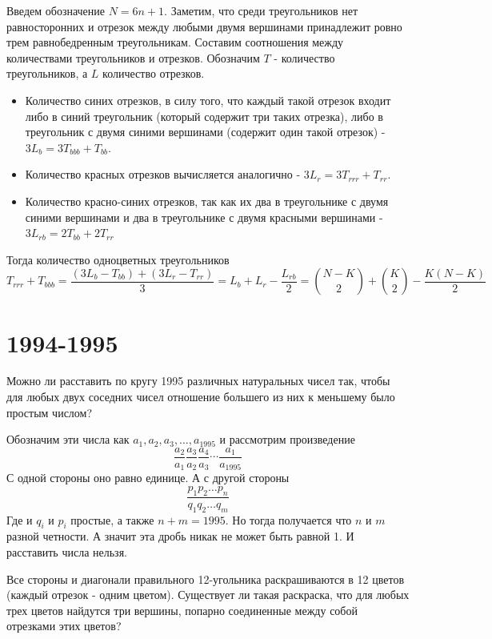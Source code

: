 \documentclass[11pt, a4paper]{problems_template}
\begin{document}
\begin{Solution}
Введем обозначение $N = 6n + 1$. Заметим, что среди треугольников нет равносторонних и отрезок между любыми двумя вершинами принадлежит ровно трем равнобедренным треугольникам. Составим соотношения между количествами треугольников и отрезков. Обозначим $T$ - количество треугольников, а $L$ количество отрезков.
\begin{itemize}
\item Количество синих отрезков, в силу того, что каждый такой отрезок входит либо в синий треугольник (который содержит три таких отрезка), либо в треугольник с двумя синими вершинами (содержит один такой отрезок) - $3L_{b} = 3 T_{bbb} + T_{bb}$.
\item Количество красных отрезков вычисляется аналогично - $3L_{r} = 3T_{rrr} + T_{rr}$.
\item Количество красно-синих отрезков, так как их два в треугольнике с двумя синими вершинами и два в треугольнике с двумя красными вершинами - $3L_{rb} = 2T_{bb}+2T_{rr}$
\end{itemize}
Тогда количество одноцветных треугольников
$$
T_{rrr} + T_{bbb} = \frac{(3L_{b} - T_{bb}) + (3L_{r} - T_{rr})}{3} = L_{b} + L_{r} - \frac{L_{rb}}{2} = \binom{N - K}{2} + \binom{K}{2} - \frac{K(N - K)}{2}
$$
\end{Solution}

\chapter{1994-1995}

\begin{exercise}
Можно ли расставить по кругу 1995 различных натуральных чисел так, чтобы для любых двух соседних чисел отношение большего из них к меньшему было простым числом?
\end{exercise}

\begin{Solution}
Обозначим эти числа как $a_{1}, a_{2}, a_{3}, \dots, a_{1995}$ и рассмотрим произведение
$$
\frac{a_{2}}{a_{1}} \frac{a_{3}}{a_{2}}\frac{a_{4}}{a_{3}}\cdots \frac{a_{1}}{a_{1995}}
$$
С одной стороны оно равно единице. А с другой стороны
$$
\frac{p_{1} p_{2} \dots p_{n}}{q_{1}q_{2}\dots q_{m}}
$$
Где и $q_{i}$ и $p_{i}$ простые, а также $n + m = 1995$. Но тогда получается что $n$ и $m$ разной четности. А значит эта дробь никак не может быть равной 1. И расставить числа нельзя.
\end{Solution}


\begin{exercise}
Все стороны и диагонали правильного 12-угольника раскрашиваются в 12 цветов (каждый отрезок - одним цветом). Существует ли такая раскраска, что для любых трех цветов найдутся три вершины, попарно соединенные между собой отрезками этих цветов?
\end{exercise}
\end{document}
